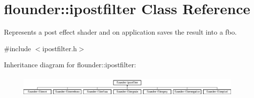 \hypertarget{classflounder_1_1ipostfilter}{}\section{flounder\+:\+:ipostfilter Class Reference}
\label{classflounder_1_1ipostfilter}


Represents a post effect shader and on application saves the result into a fbo.  




{\ttfamily \#include $<$ipostfilter.\+h$>$}

Inheritance diagram for flounder\+:\+:ipostfilter\+:\begin{figure}[H]
\begin{center}
\leavevmode
\includegraphics[height=1.095890cm]{classflounder_1_1ipostfilter}
\end{center}
\end{figure}
